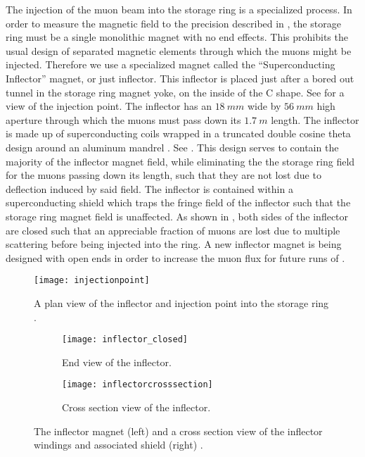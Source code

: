 The injection of the muon beam into the \gmtwo storage ring is a specialized process. In order to measure the magnetic field to the precision described in , the \gmtwo storage ring must be a single monolithic magnet with no end effects. This prohibits the usual design of separated magnetic elements through which the muons might be injected. Therefore we use a specialized magnet called the ``Superconducting Inflector'' magnet, or just inflector. This inflector is placed just after a bored out tunnel in the storage ring magnet yoke, on the inside of the C shape. See  for a view of the injection point. The inflector has an $\SI{18}{mm}$ wide by $\SI{56}{mm}$ high aperture through which the muons must pass down its $\SI{1.7}{m}$ length. The inflector is made up of superconducting coils wrapped in a truncated double cosine theta design around an aluminum mandrel \cite{inflector}. See . This design serves to contain the majority of the inflector magnet field, while eliminating the the storage ring field for the muons passing down its length, such that they are not lost due to deflection induced by said field. The inflector is contained within a superconducting shield which traps the fringe field of the inflector such that the storage ring magnet field is unaffected. As shown in , both sides of the inflector are closed such that an appreciable fraction of muons are lost due to multiple scattering before being injected into the ring. A new inflector magnet is being designed with open ends in order to increase the muon flux for future runs of \gmtwo \cite{TDR}.


\begin{figure}[]
    \centering
    \texttt{[image: injectionpoint]}
    \caption[Muon injection point through inflector]{A plan view of the inflector and injection point into the storage ring \cite{inflector}.}   
    \label{fig:injectionpoint}
\end{figure}

\begin{figure}[]
\centering
    \begin{subfigure}[t]{0.45\textwidth}
        \centering
        \texttt{[image: inflector\_closed]}
        \caption{End view of the inflector.}
    \end{subfigure}%
    \hspace{1cm}
    \begin{subfigure}[t]{0.45\textwidth}
        \centering
        \texttt{[image: inflectorcrosssection]}
        \caption{Cross section view of the inflector.}
    \end{subfigure}
\caption[Superconducting inflector magnet]{The inflector magnet (left) and a cross section view of the inflector windings and associated shield (right) \cite{inflector}.}
\label{fig:inflector}
\end{figure}



